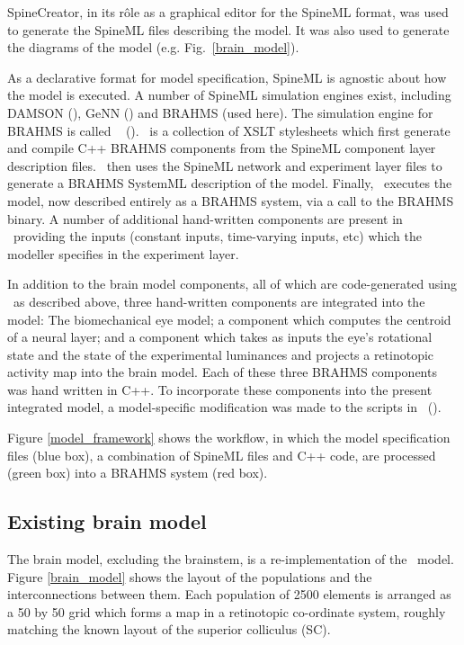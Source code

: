 \documentclass{frontiersSCNS}
\begin{document}
SpineCreator, in its r\^ole as a graphical editor for the SpineML
format, was used to generate the SpineML files describing the
model. It was also used to generate the diagrams of the model
(e.g. Fig.~\ref{brain_model}).

As a declarative format for model specification, SpineML is agnostic
about how the model is executed. A number of SpineML simulation
engines exist, including DAMSON (), GeNN
() and BRAHMS (used
here). The simulation engine for BRAHMS is called \stob~
(). \stob~is a collection of XSLT
stylesheets which first generate and compile C++ BRAHMS components
from the SpineML component layer description files. \stob~then uses
the SpineML network and experiment layer files to generate a BRAHMS
SystemML description of the model. Finally, \stob~executes the model,
now described entirely as a BRAHMS system, via a call to the BRAHMS
binary. A number of additional hand-written components are present
in \stob~providing the inputs (constant inputs, time-varying inputs,
etc) which the modeller specifies in the experiment layer.

In addition to the brain model components, all of which are
code-generated using \stob~as described above, three hand-written
components are integrated into the model: The biomechanical eye model;
a component which computes the centroid of a neural layer; and a
component which takes as inputs the eye's rotational state and the
state of the experimental luminances and projects a retinotopic
activity map into the brain model. Each of these three BRAHMS
components was hand written in C++. To incorporate these components
into the present integrated model, a model-specific modification was
made to the scripts in \stob~().

Figure \ref{model_framework} shows the workflow, in which the model
specification files (blue box), a combination of SpineML files and C++
code, are processed (green box) into a BRAHMS system (red box).

\subsection{Existing brain model}

The brain model, excluding the brainstem, is a re-implementation of
the \ccg~model. Figure \ref{brain_model} shows the layout of the
populations and the interconnections between them. Each population of
2500 elements is arranged as a 50 by 50 grid which forms a map in a
retinotopic co-ordinate system, roughly matching the known layout of
the superior colliculus (SC). %
\end{document}

